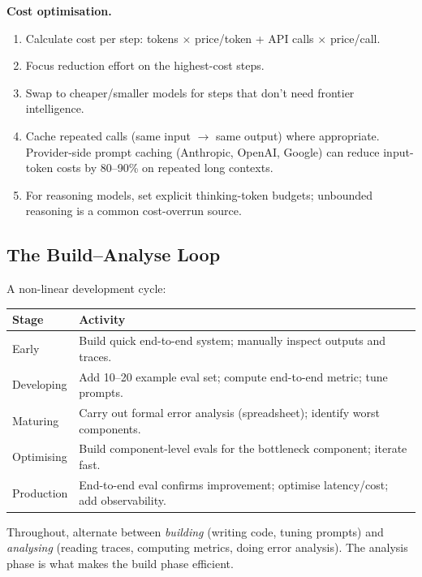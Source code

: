 \documentclass[a4paper,11pt]{article}
\begin{document}
\textbf{Cost optimisation.}
\begin{enumerate}[noitemsep, leftmargin=1.4em]
  \item Calculate cost per step: tokens $\times$ price/token + API
        calls $\times$ price/call.
  \item Focus reduction effort on the highest-cost steps.
  \item Swap to cheaper/smaller models for steps that don't need
        frontier intelligence.
  \item Cache repeated calls (same input $\to$ same output) where
        appropriate. Provider-side prompt caching (Anthropic, OpenAI,
        Google) can reduce input-token costs by 80–90\% on repeated
        long contexts.
  \item For reasoning models, set explicit thinking-token budgets;
        unbounded reasoning is a common cost-overrun source.
\end{enumerate}

\subsection{The Build–Analyse Loop}

A non-linear development cycle:

\begin{center}\small
\begin{tabular}{p{3.2cm} p{9.5cm}}
  \toprule
  \textbf{Stage} & \textbf{Activity} \\
  \midrule
  Early       & Build quick end-to-end system; manually inspect outputs and traces. \\
  Developing  & Add 10–20 example eval set; compute end-to-end metric; tune prompts. \\
  Maturing    & Carry out formal error analysis (spreadsheet); identify worst components. \\
  Optimising  & Build component-level evals for the bottleneck component; iterate fast. \\
  Production  & End-to-end eval confirms improvement; optimise latency/cost; add observability. \\
  \bottomrule
\end{tabular}
\end{center}

Throughout, alternate between \textit{building} (writing code, tuning
prompts) and \textit{analysing} (reading traces, computing metrics,
doing error analysis). The analysis phase is what makes the build
phase efficient.
\end{document}
